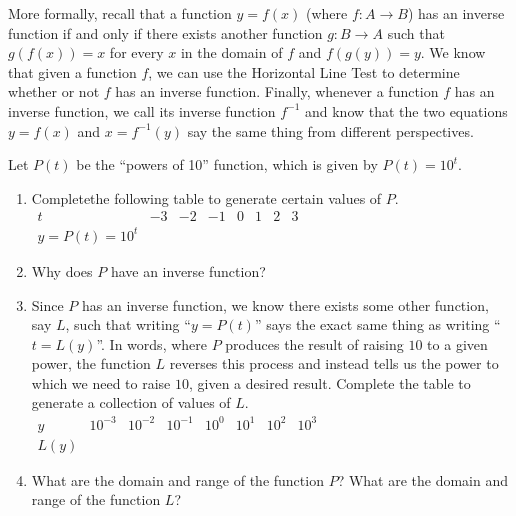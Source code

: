\documentclass[nooutcomes]{ximera}
\begin{document}
More formally, recall that a function \(y = f(x)\) (where \(f : A \to B\)) has an inverse function if and only if there exists another function \(g : B \to A\) such that \(g(f(x)) = x\) for every \(x\) in the domain of \(f\) and \(f(g(y)) = y\).    We know that given a function \(f\), we can use the Horizontal Line Test to determine whether or not \(f\) has an inverse function.  Finally, whenever a function \(f\) has an inverse function, we call its inverse function \(f^{-1}\) and know that the two equations \(y = f(x)\) and \(x = f^{-1}(y)\) say the same thing from different perspectives.%
\begin{exploration}

Let \(P(t)\) be the ``powers of 10'' function, which is given by \(P(t) = 10^t\).%

\begin{enumerate}[label=\alph*.]
\item
Completethe following table to generate certain values of \(P\).%
\\
$
\begin{array}{llllllll}
t&-3&-2&-1&0&1&2&3\\
\hline
y = P(t) = 10^t&~&~&~&~&~&~&
\end{array}
$
\item
Why does \(P\) have an inverse function?%
\item
Since \(P\) has an inverse function, we know there exists some other function, say \(L\), such that writing ``\(y = P(t)\)'' says the exact same thing as writing ``\(t = L(y)\)''.  In words, where \(P\) produces the result of raising \(10\) to a given power, the function \(L\) reverses this process and instead tells us the power to which we need to raise \(10\), given a desired result.  Complete the table to generate a collection of values of \(L\).%
\\
$
\begin{array}{llllllll}
y&10^{-3}&10^{-2}&10^{-1}&10^{0}&10^{1}&10^{2}&10^{3}\\
\hline
L(y)&~&~&~&~&~&~&
\end{array}
$
\item
What are the domain and range of the function \(P\)?  What are the domain and range of the function \(L\)?%
\end{enumerate}
%
\end{exploration}


%
%
%
\end{document}
